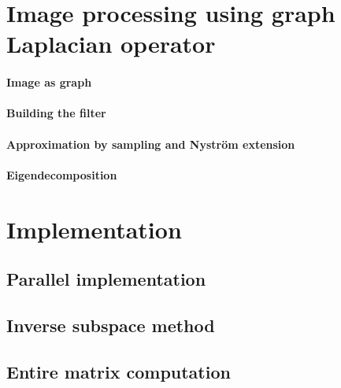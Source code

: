 \documentclass[]{article}
\begin{document}
\section{Image processing using graph Laplacian operator}


\paragraph{Image as graph}


\paragraph{Building the filter}


\paragraph{Approximation by sampling and Nystr\"om extension}


\paragraph{Eigendecomposition}


\paragraph{}


\section{Implementation}

\subsection{Parallel implementation}


\subsection{Inverse subspace method}


\subsection{Entire matrix computation}

\end{document}
